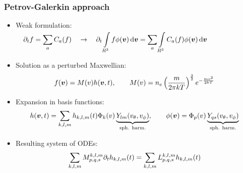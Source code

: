 \documentclass[mathserif, aspectratio=169]{beamer}
\newcommand{\ud}{\,\mathrm{d}}
\newcommand{\vect}[1]{\boldsymbol{#1}}
\newcommand{\of}[1]{\mleft( #1 \mright)}
\newcommand{\vth}{v_{\textrm{th}}}
\newcommand{\myint}[2]{\int\limits_{#1}^{#2}}
\begin{document}
\begin{frame}
\frametitle{Petrov-Galerkin approach}
%
\small
\begin{itemize}

\item Weak formulation:
$
\displaystyle
\quad
\partial_t f = \sum_{a} C_a(f)
\quad \rightarrow \quad
\partial_t \myint{R^3}{} f \phi\of{\vect{v}} \ud \vect{v} = \sum_{a}
\myint{R^3}{} C_a(f) \phi\of{\vect{v}} \ud \vect{v}
$

\item Solution as a perturbed Maxwellian:
\begin{align*}
f\of{\vect{v}} = M\of{v} h\of{\vect{v},t}
, \quad\quad
M\of{v} = n_e \left( \frac{m}{2 \pi kT }\right)^{\frac32} e^{-\frac{mv^2}{2kT}}
\end{align*}

\item Expansion in basis functions:
\begin{align*}
h\of{\vect{v},t} =
\sum_{k,l,m} h_{k,l,m} \of{t} \Phi_k\of{v} \underbrace{Y_{lm}\of{v_\theta, v_\phi}}_{\tiny\text{sph. harm.}},
\quad
\quad
\phi\of{\vect{v}} = \Phi_p\of{v} \underbrace{Y_{qs}\of{v_\theta, v_\phi}}_{\tiny\text{sph. harm.}}
\end{align*}

\item Resulting system of ODEs:
\begin{align*}
\sum_{k,l,m} M_{p,q,s}^{k,l,m} \partial_t h_{k,l,m}\of{t} = \sum_{k,l,m}  L_{p,q,s}^{k,l,m} h_{k,l,m}\of{t}
\end{align*}
\end{itemize}
%
\end{frame}
\end{document}

